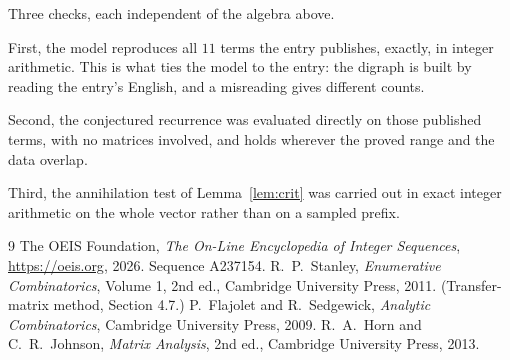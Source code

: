 \documentclass[11pt,a4paper]{article}
\theoremstyle{plain}
\theoremstyle{definition}
\begin{document}
Three checks, each independent of the algebra above.

First, the model reproduces all $11$ terms the entry publishes, exactly, in integer
arithmetic. This is what ties the model to the entry: the digraph is built by reading the
entry's English, and a misreading gives different counts.

Second, the conjectured recurrence was evaluated directly on those published terms, with no
matrices involved, and holds wherever the proved range and the data overlap.

Third, the annihilation test of Lemma~\ref{lem:crit} was carried out in exact integer
arithmetic on the whole vector rather than on a sampled prefix.

\begin{thebibliography}{9}
 The OEIS Foundation, \emph{The On-Line Encyclopedia of Integer
Sequences}, \url{https://oeis.org}, 2026. Sequence A237154.
 R.~P.~Stanley, \emph{Enumerative Combinatorics}, Volume 1, 2nd ed.,
Cambridge University Press, 2011. (Transfer-matrix method, Section 4.7.)
 P.~Flajolet and R.~Sedgewick, \emph{Analytic Combinatorics}, Cambridge
University Press, 2009.
 R.~A.~Horn and C.~R.~Johnson, \emph{Matrix Analysis}, 2nd ed., Cambridge
University Press, 2013.
\end{thebibliography}
\end{document}
